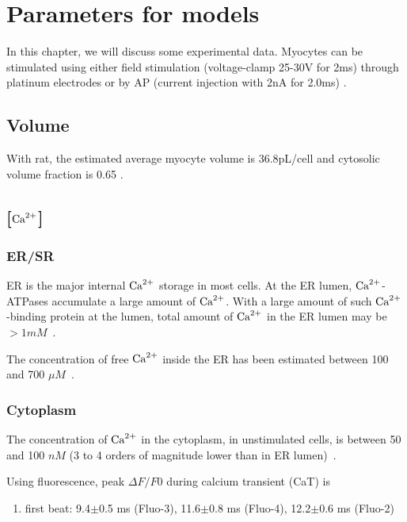 
\chapter{Parameters for models}
\label{chap:parameters-models}



In this chapter, we will discuss some experimental data. Myocytes can be
stimulated using either field stimulation (voltage-clamp 25-30V for 2ms) through
platinum electrodes or by AP (current injection with 2nA for 2.0ms) \citep{hagen2012}.

\section{Volume}

With rat, the estimated average myocyte volume is 36.8pL/cell and cytosolic
volume fraction is 0.65 \citep{bers2001ecc}.

\section{[${\text{Ca}^{2+}}$]}
\label{sec:ceca2+}

\subsection{ER/SR}
\label{sec:ersr}


ER is the major internal ${\text{Ca}^{2+}}$ storage in most cells. At the ER
lumen, ${\text{Ca}^{2+}}$-ATPases accumulate a large amount of
${\text{Ca}^{2+}}$. With a large amount of such ${\text{Ca}^{2+}}$-binding protein at
the lumen, total amount of ${\text{Ca}^{2+}}$ in the ER lumen may be $>
1mM$~\citep{foskett2007ip3r}.

The concentration of free ${\text{Ca}^{2+}}$ inside the ER has been estimated
between 100 and 700 $\mu M$~\citep{foskett2007ip3r}.

\subsection{Cytoplasm}
\label{sec:cytoplasm}

The concentration of ${\text{Ca}^{2+}}$ in the cytoplasm, in unstimulated
cells, is between 50 and 100 $nM$ (3 to 4 orders of magnitude lower
than in ER lumen)~\citep{foskett2007ip3r}. 

Using fluorescence, peak $\Delta F/F0$ during calcium transient (CaT) is
\citep{hagen2012}
\begin{enumerate}
  \item first beat: 9.4$\pm$0.5 ms (Fluo-3), 11.6$\pm$0.8 ms
  (Fluo-4), 12.2$\pm$0.6 ms (Fluo-2)
\end{enumerate} 

